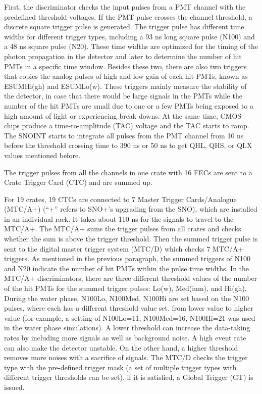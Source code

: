 First, the discriminator checks the input pulses from a PMT channel with the predefined threshold voltages. If the PMT pulse crosses the channel threshold, a discrete square trigger pulse is generated. The trigger pulse has different time widths for different trigger types, including a 93 ns long square pulse (N100) and a 48 ns square pulse (N20)\cite{joshTrigger}. These time widths are optimized for the timing of the photon propagation in the detector and later to determine the number of hit PMTs in a specific time window. Besides these two, there are also two triggers that copies the analog pulses of high and low gain of each hit PMTs, known as ESUMHi(gh) and ESUMLo(w). These triggers mainly measure the stability of the detector, in case that there would be large signals in the PMTs while the number of the hit PMTs are small due to one or a few PMTs being exposed to a high amount of light or experiencing break downs\cite{operator}. At the same time, CMOS chips produce a time-to-amplitude (TAC) voltage and the TAC starts to ramp. The SNOINT starts to integrate all pulses from the PMT channel from 10 ns before the threshold crossing time to 390 ns or 50 ns to get QHL, QHS, or QLX values mentioned before\cite{boger2000sudbury,stringer2019sensitivity}. 

The trigger pulses from all the channels in one crate with 16 FECs are sent to a Crate Trigger Card (CTC) and are summed up.

For 19 crates, 19 CTCs are connected to 7 Master Trigger Cards/Analogue (MTC/A+) (``+'' refers to SNO+'s upgrading from the SNO), which are installed in an individual rack. It takes about 110 ns for the signals to travel to the MTC/A+. The MTC/A+ sums the trigger pulses from all crates and checks whether the sum is above the trigger threshold. Then the summed trigger pulse is sent to the digital master trigger system (MTC/D) which checks 7 MTC/A+ triggers. As mentioned in the previous paragraph, the summed triggers of N100 and N20 indicate the number of hit PMTs within the pulse time widths. In the MTC/A+ discriminators, there are three different threshold values of the number of the hit PMTs for the summed trigger pulses: Lo(w), Med(ium), and Hi(gh). During the water phase, N100Lo, N100Med, N100Hi are set based on the N100 pulses, where each has a different threshold value set. from lower value to higher value (for example, a setting of N100Lo=11, N100Med=16, N100Hi=21 was used in the water phase simulations). A lower threshold can increase the data-taking rates by including more signals as well as background noise. A high event rate can also make the detector unstable. On the other hand, a higher threshold removes more noises with a sacrifice of signals. The MTC/D checks the trigger type with the pre-defined trigger mask (a set of multiple trigger types with different trigger thresholds can be set), if it is satisfied, a Global Trigger (GT) is issued\cite{snop_jinst,stringer2019sensitivity,rattime}. 

